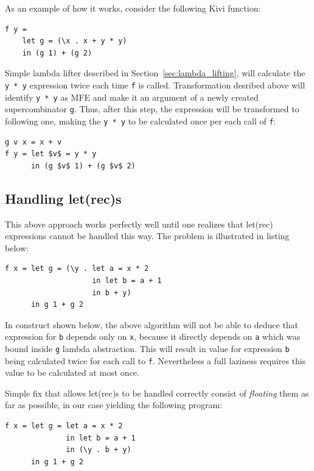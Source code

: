 \documentclass[12pt,a4paper]{report}
\begin{document}
As an example of how it works, consider the following Kivi function:

\vspace*{0.2in}
\begin{lstlisting}[style=haskell]
f y =
    let g = (\x . x + y * y)
    in (g 1) + (g 2)
\end{lstlisting}

Simple lambda lifter described in Section~\ref{sec:lambda_lifting}, will
calculate the \texttt{y * y} expression twice each time \texttt{f} is called.
Transformation desribed above will identify \texttt{y * y} as MFE and make it
an argument of a newly created supercombinator \texttt{g}. Thus, after this
step, the expression will be transformed to following one, making the \texttt{y
* y} to be calculated once per each call of \texttt{f}:

\vspace*{0.2in}
\begin{lstlisting}[style=haskell,mathescape=true]
g v x = x + v
f y = let $v$ = y * y
      in (g $v$ 1) + (g $v$ 2)
\end{lstlisting}

\subsection{Handling let(rec)s}
This above approach works perfectly well until one realizes that let(rec)
expressions cannot be handled this way. The problem is illustrated in listing
below:

\vspace*{0.2in}
\begin{lstlisting}[style=haskell]
f x = let g = (\y . let a = x * 2
                    in let b = a + 1
                    in b + y)
      in g 1 + g 2
\end{lstlisting}

In construct shown below, the above algorithm will not be able to deduce that
expression for \texttt{b} depends only on \texttt{x}, because it directly
depends on \texttt{a} which was bound inside \texttt{g} lambda abstraction.
This will result in value for expression \texttt{b} being calculated twice for
each call to \texttt{f}. Nevertheless a full laziness requires this value to
be calculated at most once.

Simple fix that allows let(rec)s to be handled correctly consist of
\textit{floating} them as far as possible, in our case yielding the following
program:

\vspace*{0.2in}
\begin{lstlisting}[style=haskell]
f x = let g = let a = x * 2
              in let b = a + 1
              in (\y . b + y)
      in g 1 + g 2
\end{lstlisting}
\end{document}
